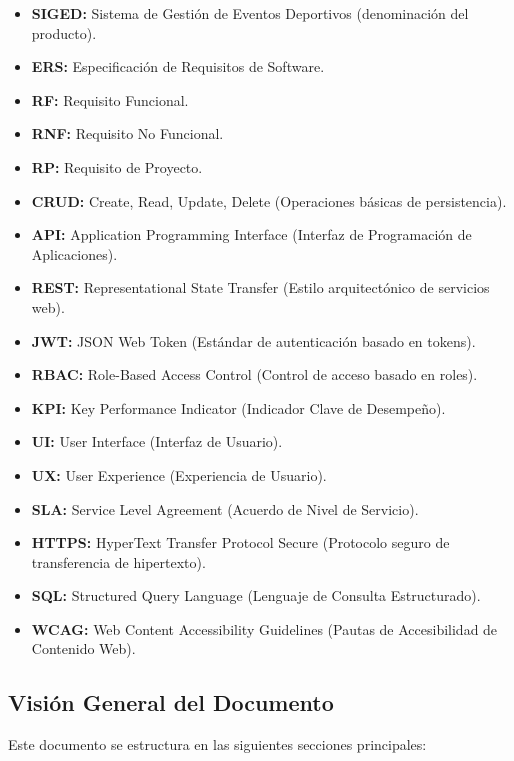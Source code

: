 \documentclass[12pt,a4paper]{article}
\begin{document}
\begin{itemize}[noitemsep]
    \item \textbf{SIGED:} Sistema de Gestión de Eventos Deportivos (denominación del producto).
    \item \textbf{ERS:} Especificación de Requisitos de Software.
    \item \textbf{RF:} Requisito Funcional.
    \item \textbf{RNF:} Requisito No Funcional.
    \item \textbf{RP:} Requisito de Proyecto.
    \item \textbf{CRUD:} Create, Read, Update, Delete (Operaciones básicas de persistencia).
    \item \textbf{API:} Application Programming Interface (Interfaz de Programación de Aplicaciones).
    \item \textbf{REST:} Representational State Transfer (Estilo arquitectónico de servicios web).
    \item \textbf{JWT:} JSON Web Token (Estándar de autenticación basado en tokens).
    \item \textbf{RBAC:} Role-Based Access Control (Control de acceso basado en roles).
    \item \textbf{KPI:} Key Performance Indicator (Indicador Clave de Desempeño).
    \item \textbf{UI:} User Interface (Interfaz de Usuario).
    \item \textbf{UX:} User Experience (Experiencia de Usuario).
    \item \textbf{SLA:} Service Level Agreement (Acuerdo de Nivel de Servicio).
    \item \textbf{HTTPS:} HyperText Transfer Protocol Secure (Protocolo seguro de transferencia de hipertexto).
    \item \textbf{SQL:} Structured Query Language (Lenguaje de Consulta Estructurado).
    \item \textbf{WCAG:} Web Content Accessibility Guidelines (Pautas de Accesibilidad de Contenido Web).
\end{itemize}


\subsection{Visión General del Documento}

Este documento se estructura en las siguientes secciones principales:
\end{document}
